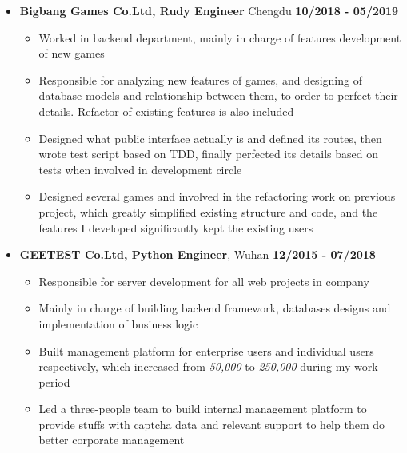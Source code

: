 \documentclass[12pt, a4paper,sans]{moderncv}     %
\begin{document}
\begin{itemize}

  \item{\textbf{Bigbang Games Co.Ltd, Rudy Engineer} \hfill{Chengdu} \hfill\textbf{10/2018 - 05/2019}}
  \vspace{2pt}
  \begin{itemize}
    \item {Worked in backend department, mainly in charge of features development of new games}
    \item {Responsible for analyzing new features of games, and designing of database models and relationship between them, to order to perfect their details. Refactor of existing features is also included}
    \item {Designed what public interface actually is and defined its routes, then wrote test script based on TDD, finally perfected its details based on tests when involved in development circle}
    \item {Designed several games and involved in the refactoring work on previous project, which greatly simplified existing structure and code, and the features I developed significantly kept the existing users}
  \end{itemize}

  \vspace{6pt}

    \item{\textbf{GEETEST Co.Ltd, Python Engineer}, \hfill{Wuhan} \hfill\textbf{12/2015 - 07/2018}}
    \vspace{2pt}
    \begin{itemize}
        \item { \medium Responsible for server development for all web projects in company}
        \item { \medium Mainly in charge of building backend framework, databases designs and implementation of business logic}
        \item { \medium Built management platform for enterprise users and individual users respectively, which increased from \textit{50,000} to \textit{250,000} during my work period}
        \item { \medium Led a three-people team to build internal management platform to provide stuffs with captcha data and relevant support to help them do better corporate management}
    \end{itemize}


\vspace{0pt}

\end{itemize}
\end{document}
